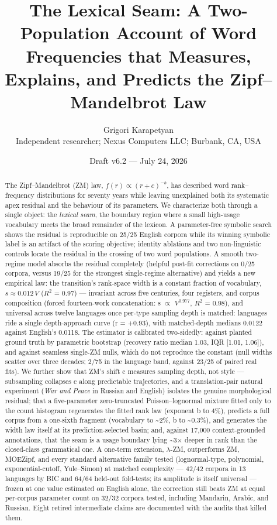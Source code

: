 \documentclass[11pt]{article}
\title{The Lexical Seam: A Two-Population Account of Word Frequencies that Measures, Explains, and Predicts the Zipf--Mandelbrot Law}
\author{Grigori Karapetyan\\ \small Independent researcher; Nexus Computers LLC; Burbank, CA, USA}
\date{Draft v6.2 --- July 24, 2026}
\begin{document}
\maketitle
\begin{abstract}
The Zipf--Mandelbrot (ZM) law, $f(r) \propto (r+c)^{-b}$, has described word rank--frequency distributions for seventy years while leaving unexplained both its systematic apex residual and the behaviour of its parameters. We characterize both through a single object: the \emph{lexical seam}, the boundary region where a small high-usage vocabulary meets the broad remainder of the lexicon. A parameter-free symbolic search shows the residual is reproducible on 25/25 English corpora while its winning symbolic label is an artifact of the scoring objective; identity ablations and two non-linguistic controls locate the residual in the crossing of two word populations. A smooth two-regime model absorbs the residual completely (helpful post-fit corrections on 0/25 corpora, versus 19/25 for the strongest single-regime alternative) and yields a new empirical law: the transition's rank-space width is a constant fraction of vocabulary, \textbf{$s \approx 0.012\,V$} ($R^2$ = 0.97) --- invariant across five centuries, four registers, and corpus composition (forced fourteen-work concatenation: s $\propto$ $V^{0.977}$, $R^2$ = 0.98), and universal across twelve languages once per-type sampling depth is matched: languages ride a single depth-approach curve (r = +0.93), with matched-depth medians 0.0122 against English's 0.0118. The estimator is calibrated two-sidedly: against planted ground truth by parametric bootstrap (recovery ratio median 1.03, IQR [1.01, 1.06]), and against seamless single-ZM nulls, which do not reproduce the constant (null widths scatter over three decades; 2/75 in the language band, against 23/25 of paired real fits). We further show that ZM's shift c measures sampling depth, not style --- subsampling collapses c along predictable trajectories, and a translation-pair natural experiment (\emph{War and Peace} in Russian and English) isolates the genuine morphological residual; that a five-parameter zero-truncated Poisson--lognormal mixture fitted only to the count histogram regenerates the fitted rank law (exponent b to 4\%), predicts a full corpus from a one-sixth fragment (vocabulary to \~{}2\%, b to \~{}0.3\%), and generates the width law itself at its prediction-selected basin; and, against 17,000 context-grounded annotations, that the seam is a usage boundary lying \~{}3$\times$ deeper in rank than the closed-class grammatical one. A one-term extension, $\lambda$-ZM, outperforms ZM, MOEZipf, and every standard alternative family tested (lognormal-type, polynomial, exponential-cutoff, Yule--Simon) at matched complexity --- 42/42 corpora in 13 languages by BIC and 64/64 held-out fold-tests; its amplitude is itself universal --- frozen at one value estimated on English alone, the correction still beats ZM at equal per-corpus parameter count on 32/32 corpora tested, including Mandarin, Arabic, and Russian. Eight retired intermediate claims are documented with the audits that killed them.
\end{abstract}
\end{document}
